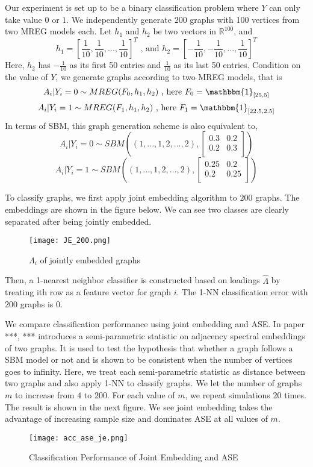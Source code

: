 \documentclass[10pt,journal,compsoc]{IEEEtran}
\begin{document}
\noindent Our experiment is set up to be a binary classification problem where $Y$ can only take value $0$ or $1$. We independently generate $200$ graphs with 100 vertices from two MREG models each. Let $h_1$ and $h_2$ be two vectors in $\mathbb{R}^{100}$, and \[h_1=[\frac{1}{10},\frac{1}{10},...,\frac{1}{10}]^T \text{ , and } h_2=[-\frac{1}{10},-\frac{1}{10},...,\frac{1}{10}]^T \] 
Here, $h_2$ has $-\frac{1}{10}$ as its first 50 entries and $\frac{1}{10}$ as its last 50 entries. Condition on the value of $Y$, we generate graphs according to two MREG models, that is 
\[A_i|Y_i=0 \sim MREG(F_0,h_1,h_2) \text{ , here } F_0= \mathbbm{1}_{[25,5]} \]
\[A_i|Y_i=1 \sim MREG(F_1,h_1,h_2) \text{ , here } F_1= \mathbbm{1}_{[22.5,2.5]} \]
In terms of SBM, this graph generation scheme is also equivalent to,
\[ A_i|Y_i=0 \sim  SBM((1,...,1,2,...,2),\begin{bmatrix} 0.3 & 0.2 \\ 0.2 & 0.3 \\ \end{bmatrix})  \]
\[ A_i|Y_i=1 \sim  SBM((1,...,1,2,...,2),\begin{bmatrix} 0.25 & 0.2 \\ 0.2 & 0.25 \\ \end{bmatrix})\]

\noindent To classify graphs, we first apply joint embedding algorithm to $200$ graphs. The embeddings are shown in the figure below. We can see two classes are clearly separated after being jointly embedded.
\begin{figure}[!htbp]
	\centering
	\texttt{[image: JE\_200.png]}
	\caption{$\Lambda_i$ of jointly embedded graphs}
\end{figure}
Then, a 1-nearest neighbor classifier is constructed based on loadings $\hat{\Lambda}$ by treating ith row as a feature vector for graph $i$. The 1-NN classification error with $200$ graphs is $0$. 

\noindent We compare classification performance using joint embedding and ASE. In paper ***, *** introduces a semi-parametric statistic on adjacency spectral embeddings of two graphs. It is used to test the hypothesis that whether a graph follows a SBM model or not and is shown to be consistent when the number of vertices goes to infinity. Here, we treat each semi-parametric statistic as distance between two graphs and also apply 1-NN to classify graphs. We let the number of graphs $m$ to increase from $4$ to $200$. For each value of $m$, we repeat simulations $20$ times. The result is shown in the next figure. We see joint embedding takes the advantage of increasing sample size and dominates ASE at all values of $m$. 
\begin{figure}[!htbp]
	\centering
	\texttt{[image: acc\_ase\_je.png]}
	\caption{Classification Performance of Joint Embedding and ASE}
\end{figure} 
\end{document}
